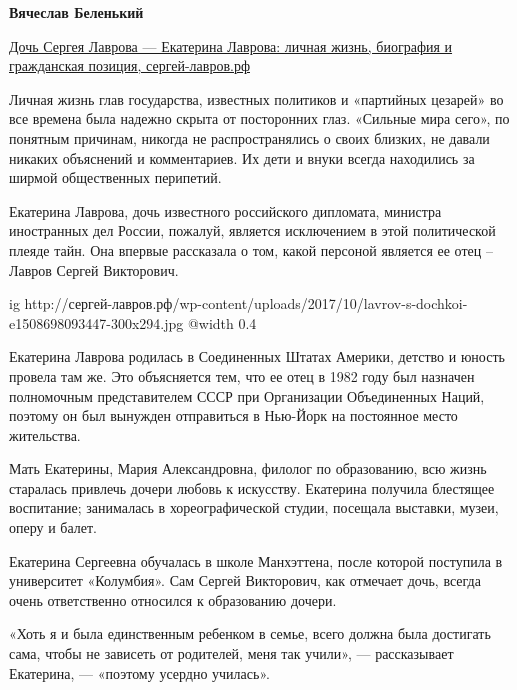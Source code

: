 \begin{itemize}
\begin{itemize}
\textbf{Вячеслав Беленький} 

\href{http://сергей-лавров.рф/doch-lavrova/}{%
Дочь Сергея Лаврова — Екатерина Лаврова: личная жизнь, биография и гражданская позиция, %
сергей-лавров.рф %
}

\begin{multicols}{2}


Личная жизнь глав государства, известных политиков и «партийных цезарей» во все
времена была надежно скрыта от посторонних глаз. «Сильные мира сего», по
понятным причинам, никогда не распространялись о своих близких, не давали
никаких объяснений и комментариев. Их дети и внуки всегда находились за ширмой
общественных перипетий.

Екатерина Лаврова, дочь известного российского дипломата, министра иностранных
дел России, пожалуй, является исключением в этой политической плеяде тайн. Она
впервые рассказала о том, какой персоной является ее отец – Лавров Сергей
Викторович.


\ifcmt
  ig http://сергей-лавров.рф/wp-content/uploads/2017/10/lavrov-s-dochkoi-e1508698093447-300x294.jpg
  @width 0.4
\fi

Екатерина Лаврова родилась в Соединенных Штатах Америки, детство и юность
провела там же. Это объясняется тем, что ее отец в 1982 году был назначен
полномочным представителем СССР при Организации Объединенных Наций, поэтому он
был вынужден отправиться в Нью-Йорк на постоянное место жительства.

Мать Екатерины, Мария Александровна, филолог по образованию, всю жизнь
старалась привлечь дочери любовь к искусству. Екатерина получила блестящее
воспитание; занималась в хореографической студии, посещала выставки, музеи,
оперу и балет.


Екатерина Сергеевна обучалась в школе Манхэттена, после которой поступила в
университет «Колумбия». Сам Сергей Викторович, как отмечает дочь, всегда очень
ответственно относился к образованию дочери.

«Хоть я и была единственным ребенком в семье, всего должна была достигать сама,
чтобы не зависеть от родителей, меня так учили», — рассказывает Екатерина, —
«поэтому усердно училась».



\end{multicols}
\end{itemize}
\end{itemize}
